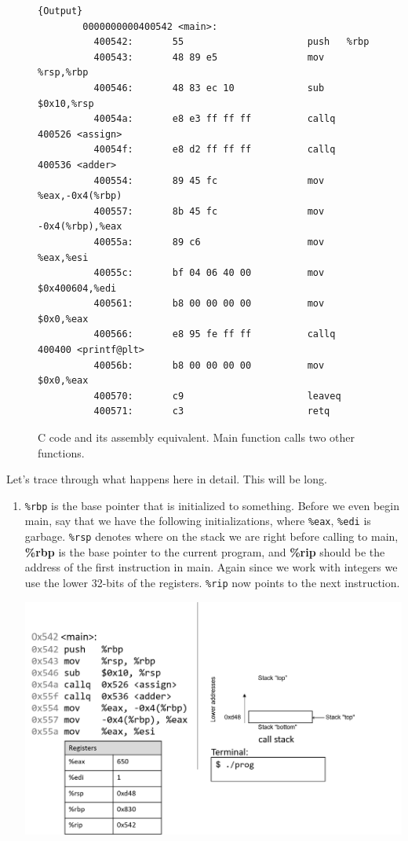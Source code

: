 \documentclass{article}
\begin{document}
\begin{example}
\begin{figure}[H]
\begin{minipage}{.74\textwidth}
\begin{lstlisting}[]{Output}
        0000000000400542 <main>:
          400542:       55                      push   %rbp
          400543:       48 89 e5                mov    %rsp,%rbp
          400546:       48 83 ec 10             sub    $0x10,%rsp
          40054a:       e8 e3 ff ff ff          callq  400526 <assign>
          40054f:       e8 d2 ff ff ff          callq  400536 <adder>
          400554:       89 45 fc                mov    %eax,-0x4(%rbp)
          400557:       8b 45 fc                mov    -0x4(%rbp),%eax
          40055a:       89 c6                   mov    %eax,%esi
          40055c:       bf 04 06 40 00          mov    $0x400604,%edi
          400561:       b8 00 00 00 00          mov    $0x0,%eax
          400566:       e8 95 fe ff ff          callq  400400 <printf@plt>
          40056b:       b8 00 00 00 00          mov    $0x0,%eax
          400570:       c9                      leaveq
          400571:       c3                      retq
      \end{lstlisting}
      \end{minipage}
      \caption{C code and its assembly equivalent. Main function calls two other functions. } 
      \label{fig:calling_functions}
    \end{figure}

    Let's trace through what happens here in detail. This will be long. 

    \begin{enumerate}
      \item \texttt{\%rbp} is the base pointer that is initialized to something. Before we even begin main, say that we have the following initializations, where \texttt{\%eax}, \texttt{\%edi} is garbage. \texttt{\%rsp} denotes where on the stack we are right before calling to main, \textbf{\%rbp} is the base pointer to the current program, and \textbf{\%rip} should be the address of the first instruction in main. Again since we work with integers we use the lower 32-bits of the registers. \texttt{\%rip} now points to the next instruction. 
        \begin{center}
          \includegraphics[scale=0.5]{img/Slide1.png}
        \end{center}  


\end{enumerate}
\end{example}
\end{document}
